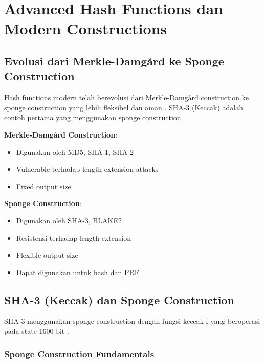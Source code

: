\section{Advanced Hash Functions dan Modern Constructions}

\subsection{Evolusi dari Merkle-Damgård ke Sponge Construction}

Hash functions modern telah berevolusi dari Merkle-Damgård construction ke sponge construction yang lebih fleksibel dan aman \cite{bertoni2011}. SHA-3 (Keccak) adalah contoh pertama yang menggunakan sponge construction.

\textbf{Merkle-Damgård Construction}:
\begin{itemize}
  \item Digunakan oleh MD5, SHA-1, SHA-2
  \item Vulnerable terhadap length extension attacks
  \item Fixed output size
\end{itemize}

\textbf{Sponge Construction}:
\begin{itemize}
  \item Digunakan oleh SHA-3, BLAKE2
  \item Resistensi terhadap length extension
  \item Flexible output size
  \item Dapat digunakan untuk hash dan PRF
\end{itemize}

\subsection{SHA-3 (Keccak) dan Sponge Construction}

SHA-3 menggunakan sponge construction dengan fungsi keccak-f yang beroperasi pada state 1600-bit \cite{keccak2015}.

\subsubsection{Sponge Construction Fundamentals}

